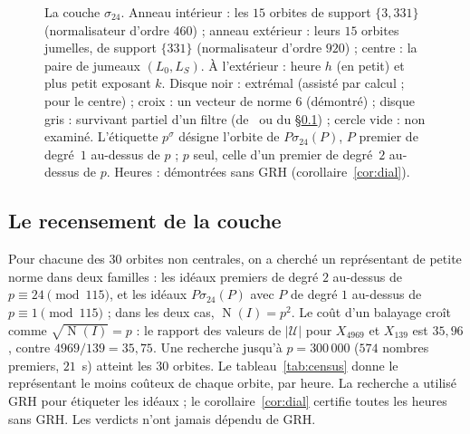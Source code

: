 \documentclass[11pt,a4paper]{amsart}
\theoremstyle{plain}
\theoremstyle{definition}
\newcommand{\Uc}{\mathcal{U}}
\DeclareMathOperator{\Nm}{N}
\newcommand{\Lz}{L_{0}}
\newcommand{\LS}{L_{S}}
\begin{document}
\begin{figure}[ht]
\centering

\caption{La couche $\sigma_{24}$. Anneau intérieur : les $15$ orbites de support $\{3,331\}$ (normalisateur d'ordre $460$) ; anneau extérieur : leurs $15$ orbites jumelles, de support $\{331\}$ (normalisateur d'ordre $920$) ; centre : la paire de jumeaux $(\Lz,\LS)$. À l'extérieur : heure $h$ (en petit) et plus petit exposant $k$. Disque noir : extrémal (assisté par calcul ; \cite{Sak26} pour le centre) ; croix : un vecteur de norme $6$ (démontré) ; disque gris : survivant partiel d'un filtre (de~\cite{Gau26} ou du \S\ref{subsec:census}) ; cercle vide : non examiné. L'étiquette $p^\sigma$ désigne l'orbite de $P\sigma_{24}(P)$, $P$ premier de degré~$1$ au-dessus de $p$ ; $p$ seul, celle d'un premier de degré~$2$ au-dessus de $p$. Heures : démontrées sans GRH (corollaire~\ref{cor:dial}).}\label{fig:dial}
\end{figure}

\subsection{Le recensement de la couche}\label{subsec:census}
Pour chacune des $30$ orbites non centrales, on a cherché un représentant de petite norme dans deux familles : les idéaux premiers de degré $2$ au-dessus de $p\equiv24\pmod{115}$, et les idéaux $P\sigma_{24}(P)$ avec $P$ de degré $1$ au-dessus de $p\equiv1\pmod{115}$ ; dans les deux cas, $\Nm(I)=p^2$. Le coût d'un balayage croît comme $\sqrt{\Nm(I)}=p$ : le rapport des valeurs de $|\Uc|$ pour $X_{4969}$ et $X_{139}$ est $35{,}96$, contre $4969/139=35{,}75$. Une recherche jusqu'à $p=300\,000$ ($574$ nombres premiers, $21$~s) atteint les $30$ orbites. Le tableau~\ref{tab:census} donne le représentant le moins coûteux de chaque orbite, par heure. La recherche a utilisé GRH pour étiqueter les idéaux ; le corollaire~\ref{cor:dial} certifie toutes les heures sans GRH. Les verdicts n'ont jamais dépendu de GRH.
\end{document}
